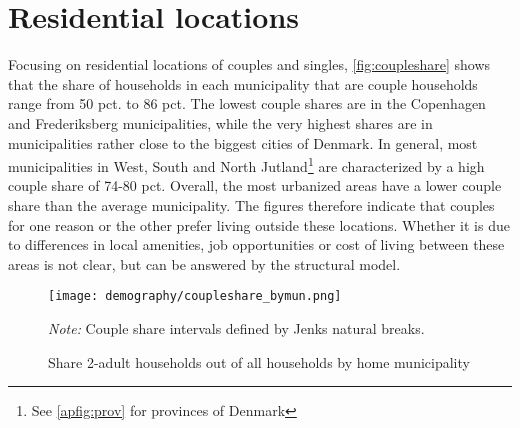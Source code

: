 \section{Residential locations}
Focusing on residential locations of couples and singles, \autoref{fig:coupleshare} shows that the share of households in each municipality that are couple households range from 50 pct. to 86 pct. The lowest couple shares are in the Copenhagen and Frederiksberg municipalities, while the very highest shares are in municipalities rather close to the biggest cities of Denmark. In general, most municipalities in West, South and North Jutland\footnote{See \autoref{apfig:prov} for provinces of Denmark} are characterized by a high couple share of 74-80 pct. Overall, the most urbanized areas have a lower couple share than the average municipality. The figures therefore indicate that couples for one reason or the other prefer living outside these locations. Whether it is due to differences in local amenities, job opportunities or cost of living between these areas is not clear, but can be answered by the structural model. 
\begin{figure}[!htb]
\centering
\begin{minipage}{0.8\textwidth}
\texttt{[image: demography/coupleshare\_bymun.png]} 
{\tiny \emph{Note:} Couple share intervals defined by Jenks natural breaks. \par}
\end{minipage}
\caption{Share 2-adult households out of all households by home municipality}
\label{fig:coupleshare}
\end{figure}

